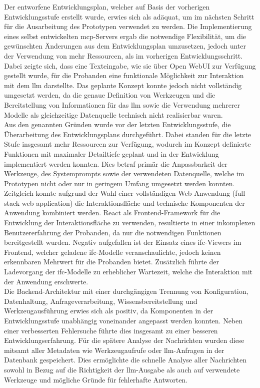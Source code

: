 Der entworfene Entwicklungsplan, welcher auf Basis der vorherigen Entwicklungsstufe erstellt wurde, 
erwies sich als adäquat, um im nächsten Schritt für die Ausarbeitung des Prototypen verwendet zu werden.
Die Implementierung eines selbst entwickelten \gls{mcp}-Servers ergab die notwendige Flexibilität, um die gewünschten Änderungen aus dem Entwicklungsplan umzusetzen,
jedoch unter der Verwendung von mehr Ressourcen, als im vorherigen Entwicklungsschritt. 
Dabei zeigte sich, dass eine Texteingabe, wie sie über Open WebUI zur Verfügung gestellt wurde, für die Probanden eine funktionale Möglichkeit zur Interaktion mit dem \gls{llm} darstellte.
Das geplante Konzept konnte jedoch nicht vollständig umgesetzt werden, da die genaue Definition von Werkzeugen und die Bereitstellung von Informationen für das \gls{llm}
sowie die Verwendung mehrerer Modelle als gleichzeitige Datenquelle technisch nicht realisierbar waren. \\

Aus den genannten Gründen wurde vor der letzten Entwicklungsstufe, die Überarbeitung des Entwicklungsplans durchgeführt.
Dabei standen für die letzte Stufe insgesamt mehr Ressourcen zur Verfügung, wodurch im Konzept definierte Funktionen mit maximaler Detailtiefe geplant und in der Entwicklung implementiert werden konnten.
Dies betraf primär die Anpassbarkeit der Werkzeuge, des Systemprompts sowie der verwendeten Datenquelle, welche im Prototypen nicht oder nur in geringem Umfang umgesetzt werden konnten.
Zeitgleich konnte aufgrund der Wahl einer vollständigen Web-Anwendung (full stack web application) die Interaktionsfläche und technische Komponenten der Anwendung kombiniert werden.
React als Frontend-Framework für die Entwicklung der Interaktionsfläche zu verwenden, resultierte in einer inkomplexen Benutzererfahrung der Probanden,
da nur die notwendigen Funktionen bereitgestellt wurden. Negativ aufgefallen ist der Einsatz eines \gls{ifc}-Viewers im Frontend,
welcher geladene \gls{ifc}-Modelle veranschaulichte, jedoch keinen erkennbaren Mehrwert für die Probanden bietet. 
Zusätzlich führte der Ladevorgang der \gls{ifc}-Modelle zu erheblicher Wartezeit, welche die Interaktion mit der Anwendung erschwerte. \\

Die Backend-Architektur mit einer durchgängigen Trennung von Konfiguration, Datenhaltung, Anfrageverarbeitung, Wissensbereitstellung und Werkzeugausführung erwies sich als positiv,
da Komponenten in der Entwicklungsstufe unabhängig voneinander angepasst werden konnten. Neben einer verbesserten Fehlersuche führte dies insgesamt zu einer besseren Entwicklungserfahrung.
Für die spätere Analyse der Nachrichten wurden diese mitsamt aller Metadaten wie Werkzeugaufrufe oder \gls{llm}-Anfragen in der Datenbank gespeichert.
Dies ermöglichte die schnelle Analyse aller Nachrichten sowohl in Bezug auf die Richtigkeit der \gls{llm}-Ausgabe als auch auf verwendete Werkzeuge und mögliche Gründe für fehlerhafte Antworten. \\

